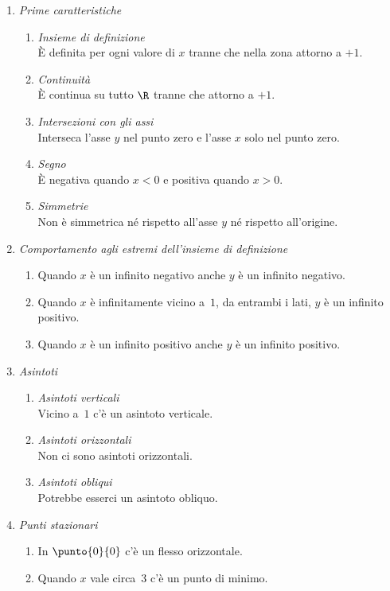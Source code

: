  \begin{enumerate} [nosep]
  \item \emph{Prime caratteristiche}
  \begin{enumerate} [nosep]
  \item \emph{Insieme di definizione}\\
  È definita per ogni valore di \(x\) tranne che nella zona attorno a \(+1\).
  \item \emph{Continuità}\\
  È continua su tutto \(\R\) tranne che attorno a \(+1\).
  \item \emph{Intersezioni con gli assi}\\
  Interseca l'asse \(y\) nel punto zero e l'asse \(x\) solo nel punto zero.
  \item \emph{Segno}\\
  È negativa quando \(x<0\) e positiva quando \(x>0\).
  \item \emph{Simmetrie}\\
  Non è simmetrica né rispetto all'asse \(y\) né rispetto all'origine.
  \end{enumerate}
  
  \item \emph{Comportamento agli estremi dell'insieme di definizione}
  \begin{enumerate} [nosep]
   \item Quando \(x\) è un infinito negativo anche \(y\) è un infinito 
negativo.
   \item Quando \(x\) è infinitamente vicino a~\(1\), da entrambi i lati, 
\(y\) è un infinito positivo.
   \item Quando \(x\) è un infinito positivo anche \(y\) è un infinito 
positivo.
  \end{enumerate}
  
  \item \emph{Asintoti}
  \begin{enumerate} [nosep]
  \item \emph{Asintoti verticali}\\
  Vicino a~\(1\) c'è un asintoto verticale.
  \item \emph{Asintoti orizzontali}\\
  Non ci sono asintoti orizzontali.
  \item \emph{Asintoti obliqui}\\
  Potrebbe esserci un asintoto obliquo.
  \end{enumerate}
  
  \item \emph{Punti stazionari}
  \begin{enumerate} [nosep]
  \item In \(\punto{0}{0}\) c'è un flesso orizzontale.
  \item Quando \(x\) vale circa~3 c'è un punto di minimo.
  \end{enumerate}
 

\end{enumerate}

